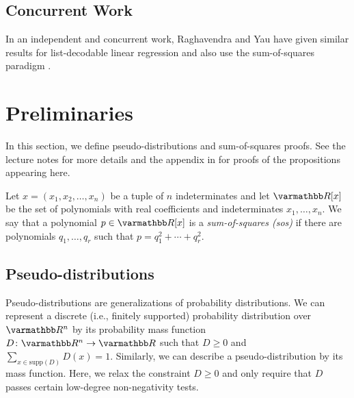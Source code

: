 \documentclass{article}
\theoremstyle{definition}
\theoremstyle{remark}
\let\mathbb\varmathbb
\newcommand{\from}{\colon}
\newcommand{\R}{\mathbb R}
\renewcommand{\geq}{\geqslant}
\renewcommand{\ge}{\geqslant}
\numberwithin{equation}{section}
\newcommand{\1}{\bm{1}}
\begin{document}
\subsection{Concurrent Work}
In an independent and concurrent work, Raghavendra and Yau have given similar results for list-decodable linear regression and also use the sum-of-squares paradigm \cite{RY19}.

\section{Preliminaries}
\label{sec:preliminaries}

In this section, we define pseudo-distributions and sum-of-squares proofs.
See the lecture notes \cite{BarakS16} for more details and the appendix in \cite{DBLP:conf/focs/MaSS16} for proofs of the propositions appearing here.

Let $x = (x_1, x_2, \ldots, x_n)$ be a tuple of $n$ indeterminates and let $\R[x]$ be the set of polynomials with real coefficients and indeterminates $x_1,\ldots,x_n$.
We say that a polynomial $p\in \R[x]$ is a \emph{sum-of-squares (sos)} if there are polynomials $q_1,\ldots,q_r$ such that $p=q_1^2 + \cdots + q_r^2$.

\subsection{Pseudo-distributions}

Pseudo-distributions are generalizations of probability distributions.
We can represent a discrete (i.e., finitely supported) probability distribution over $\R^n$ by its probability mass function $D\from \R^n \to \R$ such that $D \geq 0$ and $\sum_{x \in \mathrm{supp}(D)} D(x) = 1$.
Similarly, we can describe a pseudo-distribution by its mass function.
Here, we relax the constraint $D\ge 0$ and only require that $D$ passes certain low-degree non-negativity tests.
\end{document}
